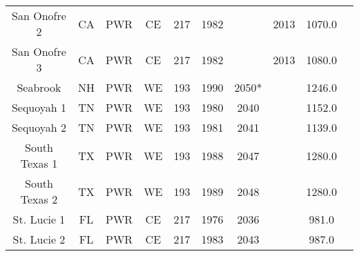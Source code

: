 \begin{table}
\begin{tabular}{c c c c c c c c c c}
    San Onofre 2        & CA & PWR & CE   & 217 & 1982 &      & 2013 & 1070.0\\
    San Onofre 3        & CA & PWR & CE   & 217 & 1982 &      & 2013 & 1080.0\\
    Seabrook            & NH & PWR & WE   & 193 & 1990 & 2050*&      & 1246.0\\
    Sequoyah 1          & TN & PWR & WE   & 193 & 1980 & 2040 &      & 1152.0\\
    Sequoyah 2          & TN & PWR & WE   & 193 & 1981 & 2041 &      & 1139.0\\
    South Texas 1       & TX & PWR & WE   & 193 & 1988 & 2047 &      & 1280.0\\
    South Texas 2       & TX & PWR & WE   & 193 & 1989 & 2048 &      & 1280.0\\
    St. Lucie 1         & FL & PWR & CE   & 217 & 1976 & 2036 &      & 981.0 \\
    St. Lucie 2         & FL & PWR & CE   & 217 & 1983 & 2043 &      & 987.0 \\
    \hline
    \end{tabular}
\end{table}

